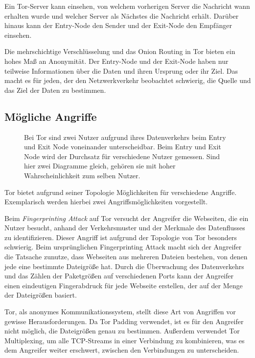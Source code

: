 Ein Tor-Server kann einsehen, von welchem vorherigen Server die Nachricht wann erhalten wurde und welcher Server als Nächstes die Nachricht erhält. Darüber hinaus kann der Entry-Node den Sender und der Exit-Node den Empfänger einsehen.

Die mehrschichtige Verschlüsselung und das Onion Routing in Tor bieten ein hohes Maß an Anonymität. Der Entry-Node und der Exit-Node haben nur teilweise Informationen über die Daten und ihren Ursprung oder ihr Ziel. Das macht es für jeden, der den Netzwerkverkehr beobachtet schwierig, die Quelle und das Ziel der Daten zu bestimmen\cite{TorWhitePaper}.

\subsection{Mögliche Angriffe}
\label{chap:tor_attacks}

\begin{figure}[h!]
    \centering
    
    \caption{Bei Tor sind zwei Nutzer aufgrund ihres Datenverkehrs beim Entry und Exit Node voneinander unterscheidbar. Beim Entry und Exit Node wird der Durchsatz für verschiedene Nutzer gemessen. Sind hier zwei Diagramme gleich, gehören sie mit hoher Wahrscheinlichkeit zum selben Nutzer.}
    \label{imgs:tor_transfer}
\end{figure}

Tor bietet aufgrund seiner Topologie Möglichkeiten für verschiedene Angriffe. Exemplarisch werden hierbei zwei Angriffsmöglichkeiten vorgestellt.

Beim \textit{Fingerprinting Attack} auf Tor versucht der Angreifer die Webseiten, die ein Nutzer besucht, anhand der Verkehrsmuster und der Merkmale des Datenflusses zu identifizieren. Dieser Angriff ist aufgrund der Topologie von Tor besonders schwierig. Beim ursprünglichen Fingerprinting Attack macht sich der Angreifer die Tatsache zunutze, dass Webseiten aus mehreren Dateien bestehen, von denen jede eine bestimmte Dateigröße hat. Durch die Überwachung des Datenverkehrs und das Zählen der Paketgrößen auf verschiedenen Ports kann der Angreifer einen eindeutigen Fingerabdruck für jede Webseite erstellen, der auf der Menge der Dateigrößen basiert\cite{AttacksOnTor}.

Tor, als anonymes Kommunikationssystem, stellt diese Art von Angriffen vor gewisse Herausforderungen. Da Tor Padding verwendet, ist es für den Angreifer nicht möglich, die Dateigrößen genau zu bestimmen. Außerdem verwendet Tor Multiplexing, um alle TCP-Streams in einer Verbindung zu kombinieren, was es dem Angreifer weiter erschwert, zwischen den Verbindungen zu unterscheiden.

